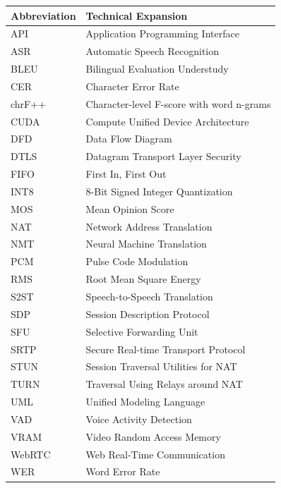 \documentclass[12pt,a4paper]{report}
\begin{document}
\begin{table}[H]
\centering
\small
\begin{tabularx}{\textwidth}{lX}
\toprule
\textbf{Abbreviation} & \textbf{Technical Expansion} \\
\midrule
API & Application Programming Interface \\
ASR & Automatic Speech Recognition \\
BLEU & Bilingual Evaluation Understudy \\
CER & Character Error Rate \\
chrF++ & Character-level F-score with word n-grams \\
CUDA & Compute Unified Device Architecture \\
DFD & Data Flow Diagram \\
DTLS & Datagram Transport Layer Security \\
FIFO & First In, First Out \\
INT8 & 8-Bit Signed Integer Quantization \\
MOS & Mean Opinion Score \\
NAT & Network Address Translation \\
NMT & Neural Machine Translation \\
PCM & Pulse Code Modulation \\
RMS & Root Mean Square Energy \\
S2ST & Speech-to-Speech Translation \\
SDP & Session Description Protocol \\
SFU & Selective Forwarding Unit \\
SRTP & Secure Real-time Transport Protocol \\
STUN & Session Traversal Utilities for NAT \\
TURN & Traversal Using Relays around NAT \\
UML & Unified Modeling Language \\
VAD & Voice Activity Detection \\
VRAM & Video Random Access Memory \\
WebRTC & Web Real-Time Communication \\
WER & Word Error Rate \\
\bottomrule
\end{tabularx}
\end{table}
\end{document}
